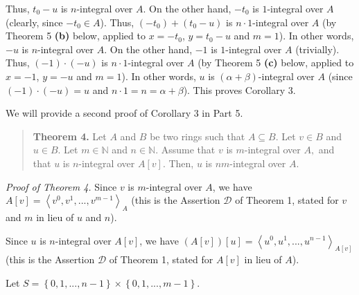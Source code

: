 \documentclass[12pt,final,notitlepage,onecolumn]{article}%
\begin{document}
Thus, $t_{0}-u$ is $n$-integral over $A$. On the other hand, $-t_{0}$ is
$1$-integral over $A$ (clearly, since $-t_{0}\in A$). Thus, $\left(
-t_{0}\right)  +\left(  t_{0}-u\right)  $ is $n\cdot1$-integral over $A$ (by
Theorem 5 \textbf{(b)} below, applied to $x=-t_{0}$, $y=t_{0}-u$ and $m=1$).
In other words, $-u$ is $n$-integral over $A$. On the other hand, $-1$ is
$1$-integral over $A$ (trivially). Thus, $\left(  -1\right)  \cdot\left(
-u\right)  $ is $n\cdot1$-integral over $A$ (by Theorem 5 \textbf{(c)} below,
applied to $x=-1$, $y=-u$ and $m=1$). In other words, $u$ is $\left(
\alpha+\beta\right)  $-integral over $A$ (since $\left(  -1\right)
\cdot\left(  -u\right)  =u$ and $n\cdot1=n=\alpha+\beta$). This proves
Corollary 3.

We will provide a second proof of Corollary 3 in Part 5.

\begin{quote}
\textbf{Theorem 4.} Let $A$ and $B$ be two rings such that $A\subseteq B$. Let
$v\in B$ and $u\in B$. Let $m\in\mathbb{N}$ and $n\in\mathbb{N}$. Assume that
$v$ is $m$-integral over $A,$ and that $u$ is $n$-integral over $A\left[
v\right]  $. Then, $u$ is $nm$-integral over $A$.
\end{quote}

\textit{Proof of Theorem 4.} Since $v$ is $m$-integral over $A$, we have
$A\left[  v\right]  =\left\langle v^{0},v^{1},...,v^{m-1}\right\rangle _{A}$
(this is the Assertion $\mathcal{D}$ of Theorem 1, stated for $v$ and $m$ in
lieu of $u$ and $n$).

Since $u$ is $n$-integral over $A\left[  v\right]  $, we have $\left(
A\left[  v\right]  \right)  \left[  u\right]  =\left\langle u^{0}%
,u^{1},...,u^{n-1}\right\rangle _{A\left[  v\right]  }$ (this is the Assertion
$\mathcal{D}$ of Theorem 1, stated for $A\left[  v\right]  $ in lieu of $A$).

Let $S=\left\{  0,1,...,n-1\right\}  \times\left\{  0,1,...,m-1\right\}  $.
\end{document}
